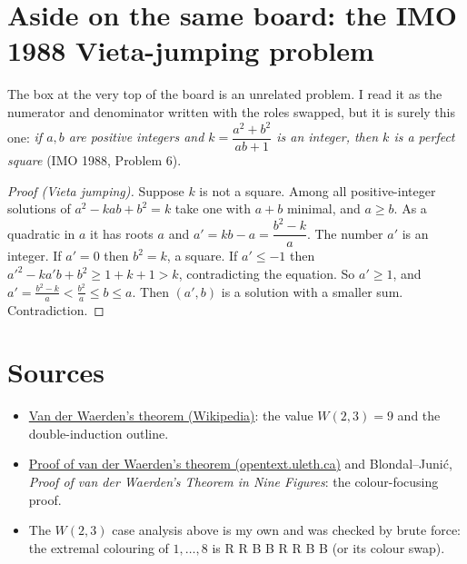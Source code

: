 \documentclass[11pt]{article}
\begin{document}
\section{Aside on the same board: the IMO 1988 Vieta-jumping problem}

The box at the very top of the board is an unrelated problem. I read it as the numerator and denominator written with the roles swapped, but it is surely this one: \emph{if $a,b$ are positive integers and $k=\dfrac{a^2+b^2}{ab+1}$ is an integer, then $k$ is a perfect square} (IMO 1988, Problem 6).

\begin{proof}[Proof (Vieta jumping)]
Suppose $k$ is not a square. Among all positive-integer solutions of $a^2-kab+b^2=k$ take one with $a+b$ minimal, and $a\ge b$. As a quadratic in $a$ it has roots $a$ and $a'=kb-a=\dfrac{b^2-k}{a}$. The number $a'$ is an integer. If $a'=0$ then $b^2=k$, a square. If $a'\le-1$ then $a'^2-ka'b+b^2\ge1+k+1>k$, contradicting the equation. So $a'\ge1$, and $a'=\frac{b^2-k}{a}<\frac{b^2}{a}\le b\le a$. Then $(a',b)$ is a solution with a smaller sum. Contradiction.
\end{proof}

\section*{Sources}
\begin{itemize}[nosep]
  \item \href{https://en.wikipedia.org/wiki/Van_der_Waerden\%27s_theorem}{Van der Waerden's theorem (Wikipedia)}: the value $W(2,3)=9$ and the double-induction outline.
  \item \href{https://opentext.uleth.ca/Ramsey/sec_proof_vdW.html}{Proof of van der Waerden's theorem (opentext.uleth.ca)} and Blondal--Juni\'c, \emph{Proof of van der Waerden's Theorem in Nine Figures}: the colour-focusing proof.
  \item The $W(2,3)$ case analysis above is my own and was checked by brute force: the extremal colouring of $1,\dots,8$ is R R B B R R B B (or its colour swap).
\end{itemize}
\end{document}
